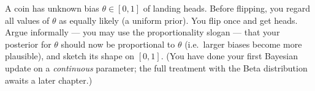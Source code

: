 \begin{exercise}
\label{ch05:exer-continuous}
A coin has unknown bias $\theta\in[0,1]$ of landing heads. Before flipping, you regard all
values of $\theta$ as equally likely (a uniform prior). You flip once and get heads.
Argue informally --- you may use the proportionality slogan --- that your posterior for
$\theta$ should now be proportional to $\theta$ (i.e.\ larger biases become more
plausible), and sketch its shape on $[0,1]$. (You have done your first Bayesian
update on a \emph{continuous} parameter; the full treatment with the Beta distribution
awaits a later chapter.)
\end{exercise}
